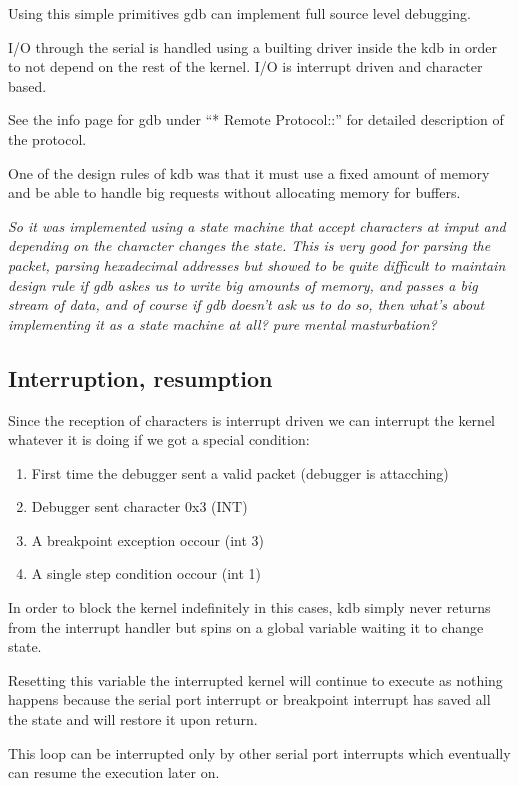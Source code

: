 Using this simple primitives \textsf{gdb} can implement full source level debugging.

I/O through the serial is handled using a builting driver inside the kdb in order to not depend on the rest of the kernel. I/O is interrupt driven and character based. 

See the info page for gdb under ``* Remote Protocol::'' for detailed description of the protocol.

One of the design rules of \textsf{kdb} was that it must use a fixed amount of memory
and be able to handle big requests without allocating memory for buffers.

\emph{So it was implemented using a state machine that accept characters at imput and depending
on the character changes the state. This is very good for parsing the packet,
 parsing hexadecimal addresses but showed to be quite difficult to maintain design rule
if gdb askes us to write big amounts of memory, and passes a big stream of data, and
of course if gdb doesn't ask us to do so, then what's about implementing it as a state machine at all? pure mental masturbation?}

\subsection{Interruption, resumption}

Since the reception of characters is interrupt driven we can interrupt the kernel 
whatever it is doing if we got a special condition:

\begin{enumerate}
\item First time the debugger sent a valid packet (debugger is attacching)
\item Debugger sent character 0x3 (INT)
\item A breakpoint exception occour (int 3)
\item A single step condition occour (int 1)
\end{enumerate}

\noindent In order to block the kernel indefinitely in this cases, kdb simply never returns
from the interrupt handler but spins on a global variable waiting it to change state.

Resetting this variable the interrupted kernel will continue to execute as nothing happens
because the serial port interrupt or breakpoint interrupt has saved all the state and will restore it upon return.

This loop can be interrupted only by other serial port interrupts which eventually
can resume the execution later on.

